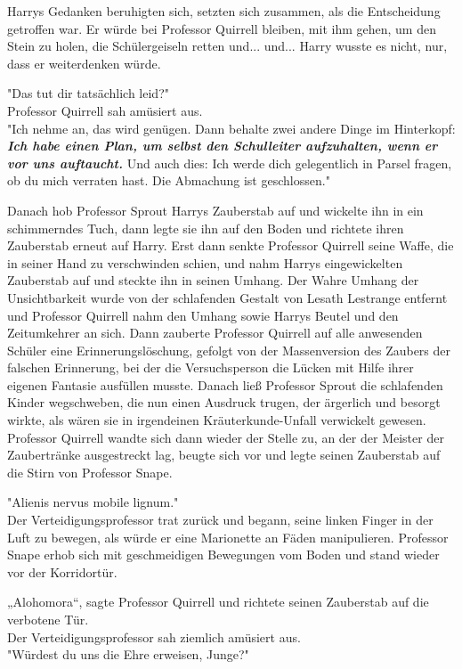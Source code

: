 {Harrys Gedanken beruhigten sich, setzten sich zusammen, als die Entscheidung getroffen war. Er würde bei Professor Quirrell bleiben, mit ihm gehen, um den Stein zu holen, die Schülergeiseln retten und... und... Harry wusste es nicht, nur, dass er weiterdenken würde.

"Das tut dir tatsächlich leid?"\\ Professor Quirrell sah amüsiert aus.\\ "Ich nehme an, das wird genügen. Dann behalte zwei andere Dinge im Hinterkopf: \textbf{\emph{Ich habe einen Plan, um selbst den Schulleiter aufzuhalten, wenn er vor uns auftaucht.}} Und auch dies: Ich werde dich gelegentlich in Parsel fragen, ob du mich verraten hast. Die Abmachung ist geschlossen."

Danach hob Professor Sprout Harrys Zauberstab auf und wickelte ihn in ein schimmerndes Tuch, dann legte sie ihn auf den Boden und richtete ihren Zauberstab erneut auf Harry. Erst dann senkte Professor Quirrell seine Waffe, die in seiner Hand zu verschwinden schien, und nahm Harrys eingewickelten Zauberstab auf und steckte ihn in seinen Umhang. Der Wahre Umhang der Unsichtbarkeit wurde von der schlafenden Gestalt von Lesath Lestrange entfernt und Professor Quirrell nahm den Umhang sowie Harrys Beutel und den Zeitumkehrer an sich. Dann zauberte Professor Quirrell auf alle anwesenden Schüler eine Erinnerungslöschung, gefolgt von der Massenversion des Zaubers der falschen Erinnerung, bei der die Versuchsperson die Lücken mit Hilfe ihrer eigenen Fantasie ausfüllen musste. Danach ließ Professor Sprout die schlafenden Kinder wegschweben, die nun einen Ausdruck trugen, der ärgerlich und besorgt wirkte, als wären sie in irgendeinen Kräuterkunde-Unfall verwickelt gewesen. Professor Quirrell wandte sich dann wieder der Stelle zu, an der der Meister der Zaubertränke ausgestreckt lag, beugte sich vor und legte seinen Zauberstab auf die Stirn von Professor Snape.

"Alienis nervus mobile lignum."\\ Der Verteidigungsprofessor trat zurück und begann, seine linken Finger in der Luft zu bewegen, als würde er eine Marionette an Fäden manipulieren. Professor Snape erhob sich mit geschmeidigen Bewegungen vom Boden und stand wieder vor der Korridortür.

„Alohomora“, sagte Professor Quirrell und richtete seinen Zauberstab auf die verbotene Tür.\\ Der Verteidigungsprofessor sah ziemlich amüsiert aus.\\ "Würdest du uns die Ehre erweisen, Junge?"

}

